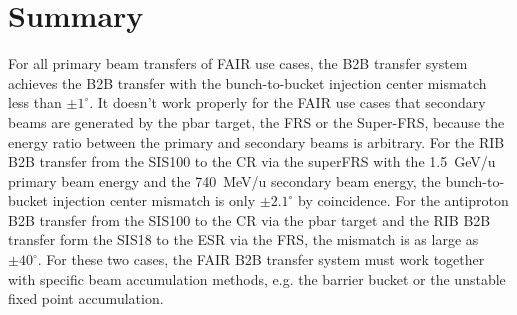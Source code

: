 
\section{Summary}
For all primary beam transfers of FAIR use cases, the B2B transfer system achieves the B2B transfer with the bunch-to-bucket injection center mismatch less than $\pm1^\circ$. It doesn't work properly for the FAIR use cases that secondary beams are generated by the pbar target, the FRS or the Super-FRS, because the energy ratio between the primary and secondary beams is arbitrary. For the RIB B2B transfer from the SIS100 to the CR via the \gls{superFRS} with the \SI{1.5}{GeV/u} primary beam energy and the \SI{740}{MeV/u} secondary beam energy, the bunch-to-bucket injection center mismatch is only $\pm2.1^\circ$ by coincidence. For the antiproton B2B transfer from the SIS100 to the CR via the pbar target and the RIB B2B transfer form the SIS18 to the ESR via the FRS, the mismatch is as large as $\pm40^\circ$. For these two cases, the FAIR B2B transfer system must work together with specific beam accumulation methods, e.g. the barrier bucket or the unstable fixed point accumulation.

